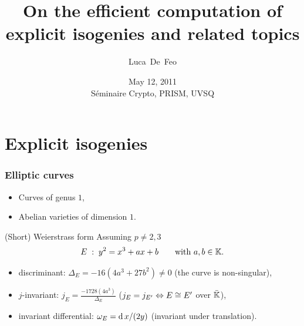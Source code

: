 \documentclass[10pt]{beamer}
\title[Explicit isogenies and related topics]{On the efficient computation of explicit isogenies and related topics}
\author{Luca~De~Feo}
\institute[IRMAR]{IRMAR, Université de Rennes 1}
\date[Versailles, May 12, 2011]{May 12, 2011\\Séminaire Crypto, PRISM, UVSQ}
\begin{document}
\begin{frame}
  \titlepage
\end{frame}


\section{Explicit isogenies}

\begin{frame}
  \frametitle{Elliptic curves}

  \begin{itemize}
  \item Curves of genus $1$,
  \item Abelian varieties of dimension $1$.
  \end{itemize}
  
  \begin{block}{(Short) Weierstrass form}
    Assuming $p\ne2,3$
    {\large
      \begin{equation*}
        E\;:\;y^2 = x^3 + ax + b\qquad\text{with $a,b\in\mathbb{K}$.}
      \end{equation*}
    }
    \begin{itemize}
    \item discriminant: \alert{$\Delta_E = -16(4a^3 + 27b^2) \ne 0$} (the curve is non-singular),
    \item $j$-invariant: \alert{$j_E=\frac{-1728(4a^3)}{\Delta_E}$}
      ($j_E=j_{E'} \Leftrightarrow E\cong E'$ over $\bar{\mathbb{K}}$),
    \item invariant differential: \alert{$\omega_E= \operatorname{d} x/(2y)$} (invariant under translation).
    \end{itemize}
  \end{block}
\end{frame}


\end{document}
